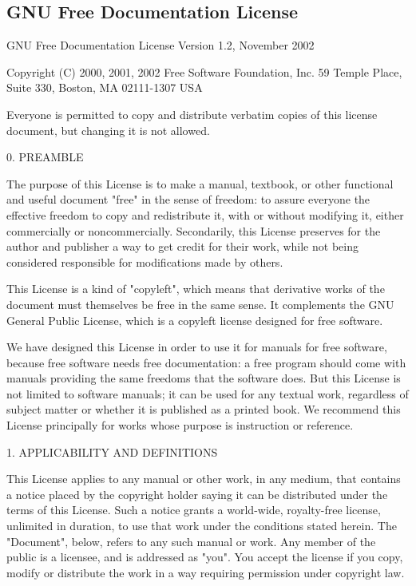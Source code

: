 \documentclass{article}
\begin{document}
\subsection{ GNU Free Documentation License }

GNU Free Documentation License Version 1.2, November 2002 

Copyright (C) 2000, 2001, 2002 Free Software Foundation, Inc. 59 Temple Place, Suite 330, Boston, MA  02111-1307 USA 

 Everyone is permitted to copy and distribute verbatim copies of this license document, but changing it is not allowed. 

0. PREAMBLE 

The purpose of this License is to make a manual, textbook, or other functional and useful document "free" in the sense of freedom: to assure everyone the effective freedom to copy and redistribute it, with or without modifying it, either commercially or noncommercially. Secondarily, this License preserves for the author and publisher a way to get credit for their work, while not being considered responsible for modifications made by others. 

This License is a kind of "copyleft", which means that derivative works of the document must themselves be free in the same sense. It complements the GNU General Public License, which is a copyleft license designed for free software. 

We have designed this License in order to use it for manuals for free software, because free software needs free documentation: a free program should come with manuals providing the same freedoms that the software does.  But this License is not limited to software manuals; it can be used for any textual work, regardless of subject matter or whether it is published as a printed book.  We recommend this License principally for works whose purpose is instruction or reference. 

1. APPLICABILITY AND DEFINITIONS 

This License applies to any manual or other work, in any medium, that contains a notice placed by the copyright holder saying it can be distributed under the terms of this License. Such a notice grants a world-wide, royalty-free license, unlimited in duration, to use that work under the conditions stated herein. The "Document", below, refers to any such manual or work. Any member of the public is a licensee, and is addressed as "you". You accept the license if you copy, modify or distribute the work in a way requiring permission under copyright law. 
\end{document}
